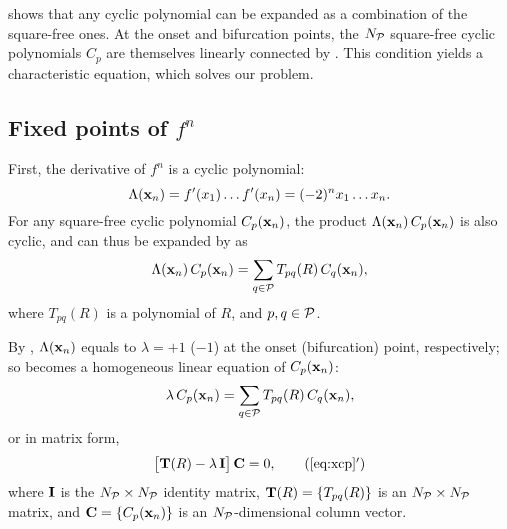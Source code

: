 \documentclass{ws-ijbc}
\begin{document}
  shows that any cyclic polynomial can be expanded
  as a combination of the square-free ones.
At the onset and bifurcation points,
  the $N_\mathcal P$ square-free cyclic polynomials $C_p$ are themselves
  linearly connected by .
This condition yields a characteristic equation,
  which solves our problem.


\subsection{\label{sec:algo}Fixed points of $f^n$}




First, the derivative of $f^n$ is a cyclic polynomial:
%
%
\begin{equation}
  \Lambda(\mathbf{x}_{n})
   = f'(x_1) \dots f'(x_n)
   = (-2)^n x_1 \dots x_n.
\label{eq:logder}
\end{equation}
%
%
For any square-free cyclic polynomial $C_p(\mathbf{x}_{n})$,
the product $\Lambda(\mathbf{x}_{n}) \, C_p(\mathbf{x}_{n})$ is also cyclic,
  and can thus be expanded by  as
\begin{equation}
  \Lambda(\mathbf{x}_{n}) \, C_p(\mathbf{x}_{n}) = \sum_{q \in \mathcal P} T_{pq}(R) \, C_q(\mathbf{x}_{n}),
\label{eq:xcp0}
\end{equation}
where $T_{pq}(R)$ is a polynomial of $R$,
and $p, q \in \mathcal P$.



By ,
  $\Lambda(\mathbf{x}_{n})$ equals to $\lambda = +1$ ($-1$)
  at the onset (bifurcation) point,
  respectively;
  so 
  becomes a homogeneous linear equation of
  $C_p(\mathbf{x}_{n})$:
\begin{equation}
  \lambda \, C_p(\mathbf{x}_{n}) = \sum_{q \in \mathcal P} T_{pq}(R) \, C_q(\mathbf{x}_{n}),
\label{eq:xcp}
\end{equation}
%
%
or in matrix form,
\begin{equation}
  \big[ \vct T(R) - \lambda \, \vct I \big] \, \vct C = 0,
\tag{\ref{eq:xcp}$'$}
\end{equation}
%
%
where
$\mathbf{I}$ is the $N_\mathcal P \times N_\mathcal P$ identity matrix,
$\mathbf{T}(R) = \{T_{pq}(R)\}$ is an $N_\mathcal P \times N_\mathcal P$ matrix,
and
$\mathbf{C} = \{C_p(\mathbf{x}_{n})\}$ is an $N_\mathcal P$-dimensional column vector.
\end{document}
